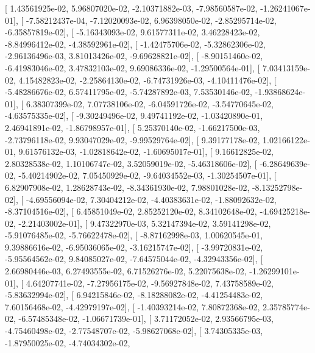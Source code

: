 \documentclass{article}
\begin{document}
       [  1.43561925e-02,   5.96807020e-02,  -2.10371882e-03,
         -7.98560587e-02,  -1.26241067e-01],
       [ -7.58212437e-04,  -7.12020093e-02,   6.96398050e-02,
         -2.85295714e-02,  -6.35857819e-02],
       [ -5.16343093e-02,   9.61577311e-02,   3.46228423e-02,
         -8.84996412e-02,  -4.38592961e-02],
       [ -1.42475706e-02,  -5.32862306e-02,  -2.96136496e-03,
          3.81013426e-02,  -9.69628821e-02],
       [ -8.90151460e-02,  -6.41983046e-02,   3.47832103e-02,
          9.69086336e-02,  -1.29500564e-01],
       [  7.03413159e-02,   4.15482823e-02,  -2.25864130e-02,
         -6.74731926e-03,  -4.10411476e-02],
       [ -5.48286676e-02,   6.57411795e-02,  -5.74287892e-03,
          7.53530146e-02,  -1.93868624e-01],
       [  6.38307399e-02,   7.07738106e-02,  -6.04591726e-02,
         -3.54770645e-02,  -4.63575335e-02],
       [ -9.30249496e-02,   9.49741192e-02,  -1.03420890e-01,
          2.46941891e-02,  -1.86798957e-01],
       [  5.25370140e-02,  -1.66217500e-03,  -2.73796118e-02,
          9.93047029e-02,  -9.99529764e-02],
       [  9.39177178e-02,   1.02166122e-01,   9.61576132e-03,
         -1.02818642e-02,  -1.60695017e-01],
       [  9.16612825e-02,   2.80328538e-02,   1.10106747e-02,
          3.52059019e-02,  -5.46318606e-02],
       [ -6.28649639e-02,  -5.40214902e-02,   7.05450929e-02,
         -9.64034552e-03,  -1.30254507e-01],
       [  6.82907908e-02,   1.28628743e-02,  -8.34361930e-02,
          7.98801028e-02,  -8.13252798e-02],
       [ -4.69556094e-02,   7.30404212e-02,  -4.40383631e-02,
         -1.88092632e-02,  -8.37104516e-02],
       [  6.45851049e-02,   2.85252120e-02,   8.34102648e-02,
         -4.69425218e-02,  -2.21403002e-01],
       [  9.47322970e-03,   5.32147394e-02,   3.59141298e-02,
         -5.91076485e-02,  -5.76622478e-02],
       [ -8.87162998e-03,   1.00620545e-01,   9.39886616e-02,
         -6.95036065e-02,  -3.16215747e-02],
       [ -3.99720831e-02,  -5.95564562e-02,   9.84085027e-02,
         -7.64575044e-02,  -4.32943356e-02],
       [  2.66980446e-03,   6.27493555e-02,   6.71526276e-02,
          5.22075638e-02,  -1.26299101e-01],
       [  4.64207741e-02,  -7.27956175e-02,  -9.56927848e-02,
          7.43758589e-02,  -5.83632994e-02],
       [  6.94215846e-02,  -8.18288082e-02,  -4.41254483e-02,
          7.60156468e-02,  -4.42979197e-02],
       [ -1.40393214e-02,   7.80872368e-02,   2.35785774e-02,
         -6.57485348e-02,  -1.06671739e-01],
       [  3.71172052e-02,   2.93566795e-03,  -4.75460498e-02,
         -2.77548707e-02,  -5.98627068e-02],
       [  3.74305335e-03,  -1.87950025e-02,  -4.74034302e-02,
\end{document}
